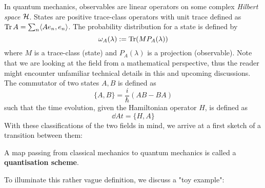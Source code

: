 In quantum mechanics, observables are linear operators on some complex \emph{Hilbert space} ${\mathcal{H}}$. States are positive trace-class operators with unit trace defined as $\operatorname{Tr} A = \sum_n \langle A e_n, e_n \rangle$. The probability distribution for a state is defined by
$$ \omega_A (\lambda) := \operatorname{Tr}(M P_A(\lambda)) $$
where $M$ is a trace-class (state) and $P_A(\lambda)$ is a projection (observable). Note that we are looking at the field from a mathematical perspective, thus the reader might encounter unfamiliar technical details in this and upcoming discussions.\\
The commutator of two states $A,B$ is defined as
$$ \{A,B\} = \frac{i}{\hbar} (AB-BA) $$
such that the time evolution, given the Hamiltonian operator $H$, is defined as
$$ \dd{A}{t} = \{H,A\} $$
With these classifications of the two fields in mind, we arrive at a first sketch of a transition between them:

\begin{definition}
  A map passing from classical mechanics to quantum mechanics is called a \textbf{quantisation scheme}.
\end{definition}

To illuminate this rather vague definition, we discuss a "toy example":

